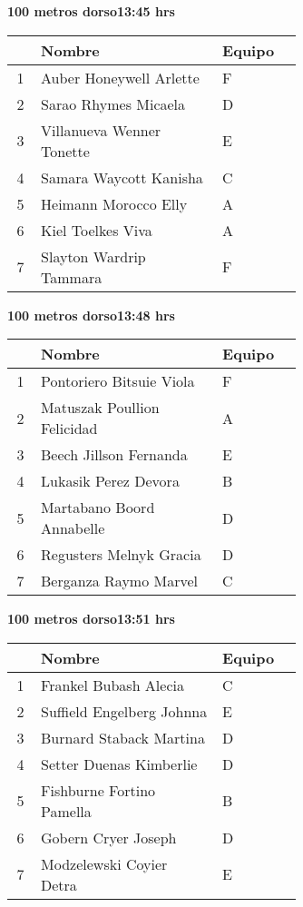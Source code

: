 \begin{minipage}{0.95\linewidth}
\begin{center}
\textbf{
100 metros dorso\hspace{1cm}13:45 hrs}
\end{center}
\begin{tabular}{cp{0.63\linewidth}l}
\hline
& \textbf{Nombre} & \textbf{Equipo} \\ \hline
1 & Auber Honeywell Arlette & F \\ 
2 & Sarao Rhymes Micaela & D \\ 
3 & Villanueva Wenner Tonette & E \\ 
4 & Samara Waycott Kanisha & C \\ 
5 & Heimann Morocco Elly & A \\ 
6 & Kiel Toelkes Viva & A \\ 
7 & Slayton Wardrip Tammara & F \\ 
\end{tabular}
\end{minipage}
\begin{minipage}{0.95\linewidth}
\begin{center}
\textbf{
100 metros dorso\hspace{1cm}13:48 hrs}
\end{center}
\begin{tabular}{cp{0.63\linewidth}l}
\hline
& \textbf{Nombre} & \textbf{Equipo} \\ \hline
1 & Pontoriero Bitsuie Viola & F \\ 
2 & Matuszak Poullion Felicidad & A \\ 
3 & Beech Jillson Fernanda & E \\ 
4 & Lukasik Perez Devora & B \\ 
5 & Martabano Boord Annabelle & D \\ 
6 & Regusters Melnyk Gracia & D \\ 
7 & Berganza Raymo Marvel & C \\ 
\end{tabular}
\end{minipage}
\begin{minipage}{0.95\linewidth}
\begin{center}
\textbf{
100 metros dorso\hspace{1cm}13:51 hrs}
\end{center}
\begin{tabular}{cp{0.63\linewidth}l}
\hline
& \textbf{Nombre} & \textbf{Equipo} \\ \hline
1 & Frankel Bubash Alecia & C \\ 
2 & Suffield Engelberg Johnna & E \\ 
3 & Burnard Staback Martina & D \\ 
4 & Setter Duenas Kimberlie & D \\ 
5 & Fishburne Fortino Pamella & B \\ 
6 & Gobern Cryer Joseph & D \\ 
7 & Modzelewski Coyier Detra & E \\ 
\end{tabular}
\end{minipage}
